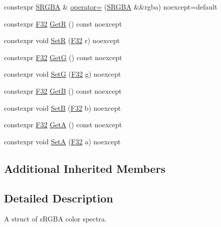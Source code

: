\begin{DoxyCompactItemize}
\item 
constexpr \mbox{\hyperlink{structmage_1_1_s_r_g_b_a}{S\+R\+G\+BA}} \& \mbox{\hyperlink{structmage_1_1_s_r_g_b_a_abf4cd2acd424cbad774a5170087f7b01}{operator=}} (\mbox{\hyperlink{structmage_1_1_s_r_g_b_a}{S\+R\+G\+BA}} \&\&rgba) noexcept=default
\item 
constexpr \mbox{\hyperlink{namespacemage_aa97e833b45f06d60a0a9c4fc22ae02c0}{F32}} \mbox{\hyperlink{structmage_1_1_s_r_g_b_a_a7f88a4619ba00d7a8d8b33e5f07b3b81}{GetR}} () const noexcept
\item 
constexpr void \mbox{\hyperlink{structmage_1_1_s_r_g_b_a_a5716004c31803848e5a0b50fee5bee55}{SetR}} (\mbox{\hyperlink{namespacemage_aa97e833b45f06d60a0a9c4fc22ae02c0}{F32}} r) noexcept
\item 
constexpr \mbox{\hyperlink{namespacemage_aa97e833b45f06d60a0a9c4fc22ae02c0}{F32}} \mbox{\hyperlink{structmage_1_1_s_r_g_b_a_a5603f67bb32b82a28758dbf26eddc8fd}{GetG}} () const noexcept
\item 
constexpr void \mbox{\hyperlink{structmage_1_1_s_r_g_b_a_a654633df97da325ed0b838e80c6c243e}{SetG}} (\mbox{\hyperlink{namespacemage_aa97e833b45f06d60a0a9c4fc22ae02c0}{F32}} g) noexcept
\item 
constexpr \mbox{\hyperlink{namespacemage_aa97e833b45f06d60a0a9c4fc22ae02c0}{F32}} \mbox{\hyperlink{structmage_1_1_s_r_g_b_a_a5797da9eb025eab2d7e8b3331a8fd312}{GetB}} () const noexcept
\item 
constexpr void \mbox{\hyperlink{structmage_1_1_s_r_g_b_a_ae3cd3242e9b75444d8e6ae6bd9098b58}{SetB}} (\mbox{\hyperlink{namespacemage_aa97e833b45f06d60a0a9c4fc22ae02c0}{F32}} b) noexcept
\item 
constexpr \mbox{\hyperlink{namespacemage_aa97e833b45f06d60a0a9c4fc22ae02c0}{F32}} \mbox{\hyperlink{structmage_1_1_s_r_g_b_a_a90ab59ec00e8e710a1d679cb0277373f}{GetA}} () const noexcept
\item 
constexpr void \mbox{\hyperlink{structmage_1_1_s_r_g_b_a_a42ec1125cb5f2ccc4520b6f0c195ae59}{SetA}} (\mbox{\hyperlink{namespacemage_aa97e833b45f06d60a0a9c4fc22ae02c0}{F32}} a) noexcept
\end{DoxyCompactItemize}
\subsection*{Additional Inherited Members}


\subsection{Detailed Description}
A struct of s\+R\+G\+BA color spectra. 

